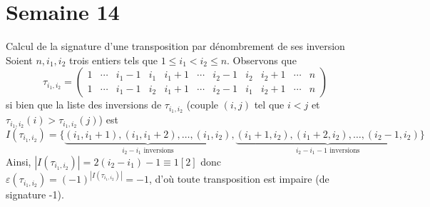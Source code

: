 \documentclass{article}
\renewenvironment{question_kholle}[2][ ]
{
	\subsection{\texorpdfstring{#2}{}}
	\notblank{#1}
	{
		\noindent #1
		\bigbreak
	}
	{}
	\begin{proof}
}
{
	\end{proof}
}
\begin{document}
\pagebreak\section{Semaine 14}

\begin{question_kholle}{Calcul de la signature d’une transposition par dénombrement de ses inversion}
	Soient $n, i_{1}, i_{2}$ trois entiers tels que $1\leq i_{1}<i_{2}\leq n$. Observons que
	\[
		\tau_{i_{1}, i_{2}} = \left(\begin{array}{ccccccccccc}
				1 & \cdots & i_{1}-1 & i_{1} & i_{1}+1 & \cdots & i_{2}-1 & i_{2} & i_{2}+1 & \cdots & n \\
				1 & \cdots & i_{1}-1 & i_{2} & i_{1}+1 & \cdots & i_{2}-1 & i_{1} & i_{2}+1 & \cdots & n
			\end{array}\right)
	\]
	si bien que la liste des inversions de $\tau_{i_{1}, i_{2}}$ (couple $(i,j)$ tel que $i<j$ et $\tau_{i_{1}, i_{2}}(i)>\tau_{i_{1}, i_{2}}(j)$) est
	\[
		I(\tau_{i_{1}, i_{2}})=\{\underbrace{(i_{1}, i_{1}+1),(i_{1}, i_{1}+2), \dots, (i_{1}, i_{2})}_{\text{$i_{2}-i_{1}$ inversions}}, \underbrace{(i_{1}+1, i_{2}), (i_{1}+2, i_{2}), \dots, (i_{2}-1, i_{2})}_{\text{$i_{2}-i_{1}-1$ inversions}}\}
	\]
	Ainsi, $|I(\tau_{i_{1}, i_{2}})| = 2(i_{2}-i_{1})-1 \equiv 1[2]$ donc $\varepsilon(\tau_{i_{1}, i_{2}}) = (-1)^{|I(\tau_{i_{1}, i_{2}})|}=-1$, d’où toute transposition est impaire (de signature -1).
\end{question_kholle}
\end{document}
